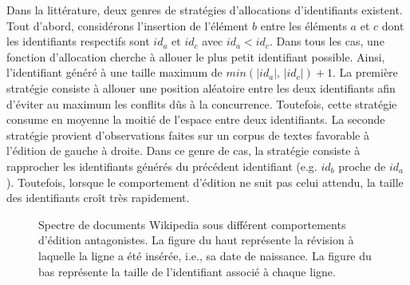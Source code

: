 Dans la littérature, deux genres de stratégies d'allocations d'identifiants
existent. Tout d'abord, considérons l'insertion de l'élément $b$ entre les
éléments $a$ et $c$ dont les identifiants respectifs sont $id_a$ et $id_c$ avec
$id_a<id_c$. Dans tous les cas, une fonction d'allocation cherche à allouer le
plus petit identifiant possible. Ainsi, l'identifiant généré à une taille
maximum de $min(|id_a|,\, |id_c|)+1$. La première stratégie consiste à allouer
une position aléatoire entre les deux identifiants afin d'éviter au maximum les
conflits dûs à la concurrence. Toutefois, cette stratégie consume en moyenne la
moitié de l'espace entre deux identifiants. La seconde stratégie provient
d'observations faites sur un corpus de textes favorable à l'édition de gauche à
droite. Dans ce genre de cas, la stratégie consiste à rapprocher les
identifiants générés du précédent identifiant (e.g. $id_b$ proche de
$id_a$). Toutefois, lorsque le comportement d'édition ne suit pas celui attendu,
la taille des identifiants croît très rapidement.

\begin{figure}
  \centering
  \hspace{10pt}
  \caption{\label{fig:allocation}Spectre de documents Wikipedia sous différent
    comportements d'édition antagonistes. La figure du haut représente la
    révision à laquelle la ligne a été insérée, i.e., sa date de naissance.  La
    figure du bas représente la taille de l'identifiant associé à chaque ligne.}
\end{figure}

